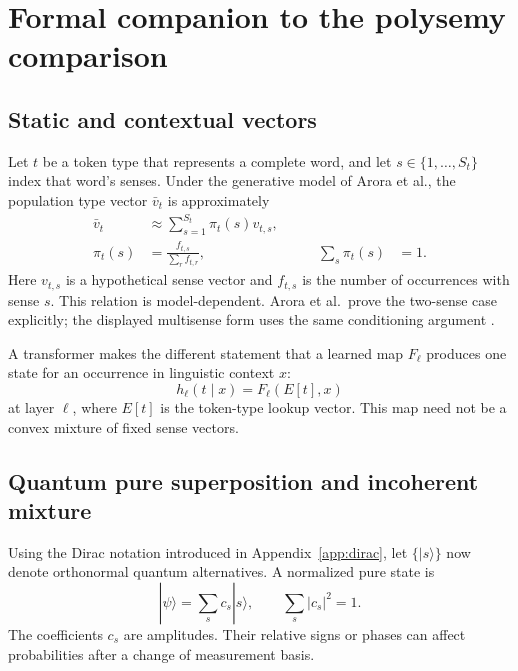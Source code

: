 \documentclass[
  aps,
  reprint,
  superscriptaddress,
  floatfix,
  nofootinbib,
  longbibliography
]{revtex4-2}
\begin{document}
\section{Formal companion to the polysemy comparison}
\label{app:polysemy}

\subsection{Static and contextual vectors}

Let $t$ be a token type that represents a complete word, and let
$s\in\{1,\ldots,S_t\}$ index that word's senses.  Under the generative model
of Arora et al., the population type vector $\bar v_t$ is approximately
\begin{equation}
\begin{aligned}
 \bar v_t&\approx\sum_{s=1}^{S_t}\pi_t(s)v_{t,s},\\
 \pi_t(s)&=\frac{f_{t,s}}{\sum_r f_{t,r}},
 &\qquad \sum_s\pi_t(s)&=1.
\end{aligned}
 \label{eq:arora-app}
\end{equation}
Here $v_{t,s}$ is a hypothetical sense vector and $f_{t,s}$ is the number of
occurrences with sense $s$.  This relation is model-dependent.  Arora et al.\
prove the two-sense case explicitly; the displayed multisense form uses the
same conditioning argument
\cite{arora-etal-2018-linear}.

A transformer makes the different statement that a learned map $F_\ell$
produces one state for an occurrence in linguistic context $x$:
\begin{equation}
 h_\ell(t\mid x)=F_\ell(E[t],x)
 \label{eq:context-state-app}
\end{equation}
at layer $\ell$, where $E[t]$ is the token-type lookup vector.  This map need
not be a convex mixture of fixed sense vectors.

\subsection{Quantum pure superposition and incoherent mixture}

Using the Dirac notation introduced in Appendix~\ref{app:dirac}, let
$\{|s\rangle\}$ now denote orthonormal quantum alternatives.  A normalized
pure state is
\begin{equation}
 |\psi\rangle=\sum_s c_s|s\rangle,
 \qquad
 \sum_s|c_s|^2=1.
 \label{eq:pure-superposition-app}
\end{equation}
The coefficients $c_s$ are amplitudes.  Their relative signs or phases can
affect probabilities after a change of measurement basis.
\end{document}
